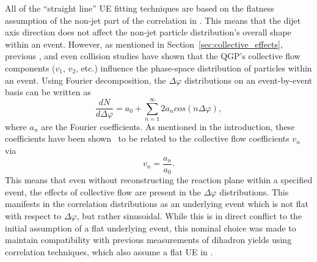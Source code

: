 All of the ``straight line'' UE fitting techniques are based on the flatness assumption of the non-jet part of the correlation in \dphi. This means that the dijet axis direction does not affect the non-jet particle distribution's overall shape within an event. However, as mentioned in Section~\ref{sec:collective_effects}, previous \PbPb, \pPb and even \pp collision studies have shown that the QGP's collective flow components ($v_{1}$, $v_{2}$, etc.) influence the phase-space distribution of particles within an event. Using Fourier decomposition, the $\Delta\varphi$ distributions on an event-by-event basis can be written as
%
\begin{equation}
    \label{eq:dphi_fourier_decomposition}
    \frac{dN}{d\Delta\varphi} = a_{0} + \sum_{n=1}^{\infty}2a_{n}cos(n\Delta\varphi),
\end{equation}
%
where $a_{n}$ are the Fourier coefficients. As mentioned in the introduction, these coefficients have been shown~\cite{Justin108, Justin109, Justin110} to be related to the collective flow coefficients $v_{n}$ via
%
\begin{equation}
    \label{eq:fourier_vn_relation}
    v_{n} = \frac{a_{n}}{a_{0}}.
\end{equation}
%
This means that even without reconstructing the reaction plane within a specified event, the effects of collective flow are present in the $\Delta\varphi$ distributions. This manifests in the correlation distributions as an underlying event which is not flat with respect to $\Delta\varphi$, but rather sinusoidal. While this is in direct conflict to the initial assumption of a flat underlying event, this nominal choice was made to maintain compatibility with previous measurements of dihadron yields using correlation techniques, which also assume a flat UE in \dphi.

